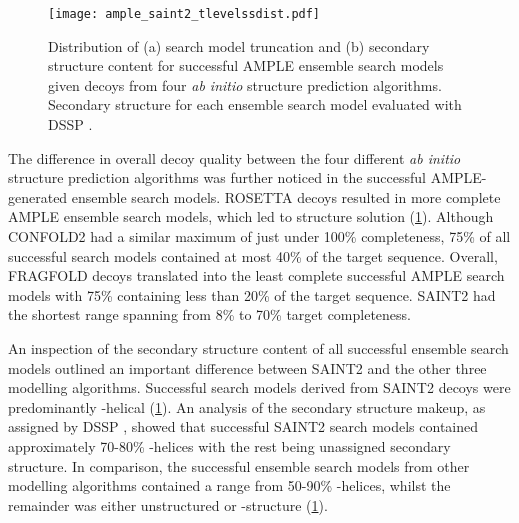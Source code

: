\begin{figure}[H]
    \centering
    \texttt{[image: ample\_saint2\_tlevelssdist.pdf]}
    \caption[Distribution of search model truncation and secondary structure content]{Distribution of (a) search model truncation and (b) secondary structure content for successful AMPLE ensemble search models given decoys from four \textit{ab initio} structure prediction algorithms. Secondary structure for each ensemble search model evaluated with DSSP \cite{Frishman1995-si}.}
    \label{fig:ample_saint2_tlevelssdist}
\end{figure}

The difference in overall decoy quality between the four different \textit{ab initio} structure prediction algorithms was further noticed in the successful AMPLE-generated ensemble search models. ROSETTA decoys resulted in more complete AMPLE ensemble search models, which led to structure solution (\cref{fig:ample_saint2_tlevelssdist}). Although CONFOLD2 had a similar maximum of just under 100\% completeness, 75\% of all successful search models contained at most 40\% of the target sequence. Overall, FRAGFOLD decoys translated into the least complete successful AMPLE search models with 75\% containing less than 20\% of the target sequence. SAINT2 had the shortest range spanning from 8\% to 70\% target completeness.

An inspection of the secondary structure content of all successful ensemble search models outlined an important difference between SAINT2 and the other three modelling algorithms. Successful search models derived from SAINT2 decoys were predominantly \textalpha-helical (\cref{fig:ample_saint2_tlevelssdist}). An analysis of the secondary structure makeup, as assigned by DSSP \cite{Frishman1995-si}, showed that successful SAINT2 search models contained approximately 70-80\% \textalpha-helices with the rest being unassigned secondary structure. In comparison, the successful ensemble search models from other modelling algorithms contained a range from 50-90\% \textalpha-helices, whilst the remainder was either unstructured or \textbeta-structure (\cref{fig:ample_saint2_tlevelssdist}).

